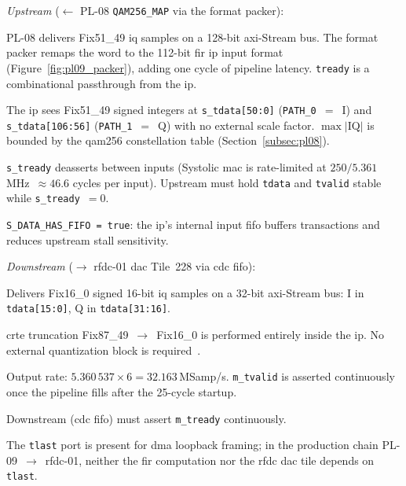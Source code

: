 \textit{Upstream} ($\leftarrow$ PL-08 \texttt{QAM256\_MAP}
via the format packer):
\begin{tightemize}
  \item PL-08 delivers Fix51\_49 \ac{iq} samples on a 128-bit
        \ac{axi}-Stream bus.
        The format packer remaps the word to the 112-bit \ac{fir} \ac{ip}
        input format (Figure~\ref{fig:pl09_packer}), adding one cycle of
        pipeline latency.
        \texttt{tready} is a combinational passthrough from the \ac{ip}.
  \item The \ac{ip} sees Fix51\_49 signed integers at
        \texttt{s\_tdata[50:0]} (\texttt{PATH\_0}~$=$~I) and
        \texttt{s\_tdata[106:56]} (\texttt{PATH\_1}~$=$~Q) with no
        external scale factor.
        $\max|\text{IQ}|$ is bounded by the \ac{qam256}
        constellation table (Section~\ref{subsec:pl08}).
  \item \texttt{s\_tready} deasserts between inputs (Systolic \ac{mac}
        is rate-limited at $250 / 5.361$\,MHz~$\approx 46.6$ cycles per
        input).
        Upstream must hold \texttt{tdata} and \texttt{tvalid} stable
        while \texttt{s\_tready}~$= 0$.
  \item \texttt{S\_DATA\_HAS\_FIFO = true}: the \ac{ip}'s internal input
        \ac{fifo} buffers transactions and reduces upstream stall sensitivity.
\end{tightemize}

\textit{Downstream} ($\rightarrow$ \ac{rfdc}-01 \ac{dac} Tile~228
via \ac{cdc} \ac{fifo}):
\begin{tightemize}
  \item Delivers Fix16\_0 signed 16-bit \ac{iq} samples on a 32-bit
        \ac{axi}-Stream bus: I in \texttt{tdata[15:0]},
        Q in \texttt{tdata[31:16]}.
  \item \ac{crte} truncation Fix87\_49~$\to$~Fix16\_0 is performed
        entirely inside the \ac{ip}.
        No external quantization block is required~\cite{AMD_PG149}.
  \item Output rate: $5.360\,537 \times 6 = 32.163$\,MSamp/s.
        \texttt{m\_tvalid} is asserted continuously once the pipeline
        fills after the 25-cycle startup.
  \item Downstream (\ac{cdc} \ac{fifo}) must assert \texttt{m\_tready}
        continuously.
  \item The \texttt{tlast} port is present for \ac{dma} loopback framing;
        in the production chain PL-09~$\to$~\ac{rfdc}-01, neither the
        \ac{fir} computation nor the \ac{rfdc} \ac{dac} tile depends on
        \texttt{tlast}.
\end{tightemize}

